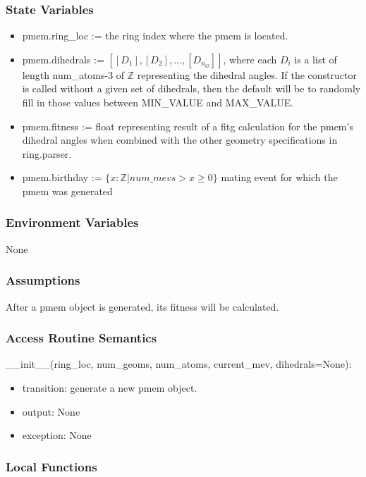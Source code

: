\documentclass[12pt, titlepage]{article}
\begin{document}
\subsubsection{State Variables}

\begin{itemize}
	\item pmem.ring\_loc := the ring index where the pmem is located.
	\item pmem.dihedrals := $[[D_1], [D_2], ..., [D_{n_G}]]$, where each $D_i$ 
	is a list of length num\_atoms-3 of $\mathbb{Z}$ representing the dihedral 
	angles. If the constructor is called without a given set of dihedrals, then 
	the default will be to randomly fill in those values between MIN\_VALUE and 
	MAX\_VALUE.
	\item pmem.fitness := float representing result of a fitg calculation for 
	the pmem's dihedral angles when combined with the other geometry 
	specifications in ring.parser.
	\item pmem.birthday := $\{x:\mathbb{Z} | num\_mevs > x \geq 0\}$ mating 
	event 
	for which the pmem was generated
\end{itemize}

\subsubsection{Environment Variables}

None

\subsubsection{Assumptions}

After a pmem object is generated, its fitness will be calculated.

\subsubsection{Access Routine Semantics}

\noindent \_\_init\_\_(ring\_loc, num\_geoms, num\_atoms, current\_mev, 
dihedrals=None):
\begin{itemize}
	\item transition: generate a new pmem object.
	\item output: None
	\item exception: None
\end{itemize}

\subsubsection{Local Functions}
\end{document}
